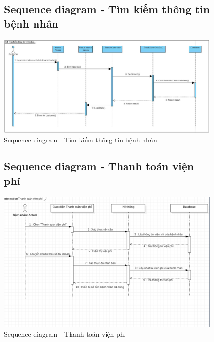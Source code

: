 \documentclass{report}
\begin{document}
\begin{center}
	\begin{figure}[!htp]
		\subsection{Sequence diagram - Tìm kiếm thông tin bệnh nhân}
		\begin{center}
			\includegraphics[scale=.3]{Hinh/Sequence diagram Tìm kiếm thông tin bệnh nhân.jpg}
		\end{center}
		\caption{Sequence diagram - Tìm kiếm thông tin bệnh nhân}
	\end{figure}
\end{center}

\pagebreak
\begin{center}
	\begin{figure}[!htp]
		\subsection{Sequence diagram - Thanh toán viện phí}
		\begin{center}
			\includegraphics[scale=1]{Hinh/Sequence diagram Thanh toán viện phí.png}
		\end{center}
		\caption{Sequence diagram - Thanh toán viện phí}
	\end{figure}
\end{center}
\end{document}

